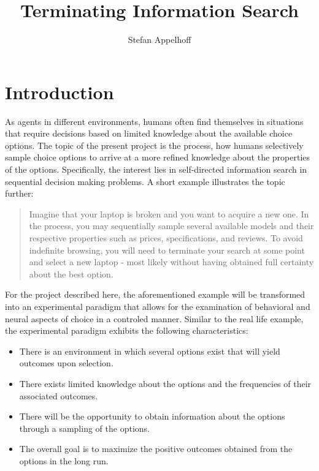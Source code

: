 \documentclass[
	12pt,
	oneside,
	bibliography=totocnumbered]{scrartcl}
\title{Terminating Information Search}
\author{Stefan Appelhoff}
\begin{document}
\maketitle
\tableofcontents



\section{Introduction}

As agents in different environments, humans often find themselves in situations that require decisions based on limited knowledge about the available choice options. The topic of the present project is the process, how humans selectively sample choice options to arrive at a more refined knowledge about the properties of the options. Specifically, the interest lies in self-directed information search in sequential decision making problems. A short example illustrates the topic further: 

\begin{quotation}
Imagine that your laptop is broken and you want to acquire a new one. In the process, you may sequentially sample several available models and their respective properties such as prices, specifications, and reviews. To avoid indefinite browsing, you will need to terminate your search at some point and select a new laptop - most likely without having obtained full certainty about the best option.
\end{quotation} 

For the project described here, the aforementioned example will be transformed into an experimental paradigm that allows for the examination of behavioral and neural aspects of choice in a controled manner. Similar to the real life example, the experimental paradigm exhibits the following characteristics:

\begin{itemize}
\item There is an environment in which several options exist that will yield outcomes upon selection.
\item There exists limited knowledge about the options and the frequencies of their associated outcomes.
\item There will be the opportunity to obtain information about the options through a sampling of the options.
\item The overall goal is to maximize the positive outcomes obtained from the options in the long run.
\end{itemize}
\end{document}
